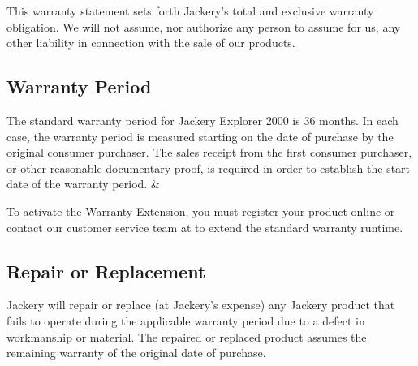 \documentclass[a4paper,10pt,twoside,openany,english]{sphinxhowto}
\begin{document}
\sphinxAtStartPar
This warranty statement sets forth Jackery’s total and exclusive warranty obligation.
We will not assume, nor authorize any person to assume for us, any other liability in connection with the sale of our products.


\subsection{Warranty Period}
\label{\detokenize{index:warranty-period}}

\begin{savenotes}\sphinxattablestart
\sphinxthistablewithglobalstyle
\centering
\begin{tabular}[t]{}
\sphinxtoprule
\sphinxtableatstartofbodyhook
\sphinxAtStartPar
{}

\sphinxAtStartPar
{}

\sphinxAtStartPar
The standard warranty period for Jackery Explorer 2000 is 36 months.
In each case, the warranty period is measured starting on the date of purchase
by the original consumer purchaser.
The sales receipt from the first consumer purchaser, or other reasonable documentary proof,
is required in order to establish the start date of the warranty period.
&
\sphinxAtStartPar
{}

\sphinxAtStartPar
{}

\sphinxAtStartPar
To activate the Warranty Extension, you must register your product online
or contact our customer service team at 
to extend the standard warranty runtime.
\\
\sphinxbottomrule
\end{tabular}
\sphinxtableafterendhook\par
\sphinxattableend\end{savenotes}


\subsection{Repair or Replacement}
\label{\detokenize{index:repair-or-replacement}}
\sphinxAtStartPar
Jackery will repair or replace (at Jackery’s expense) any Jackery product that fails to operate
during the applicable warranty period due to a defect in workmanship or material.
The repaired or replaced product assumes the remaining warranty of the original date of purchase.
\end{document}
